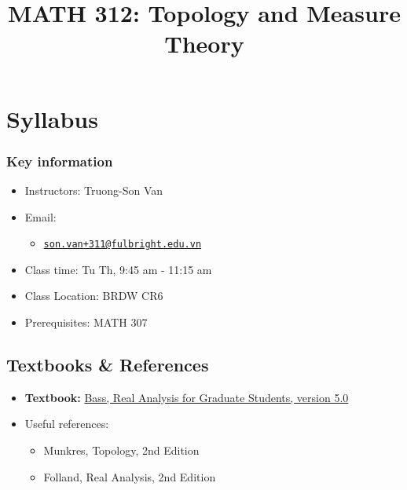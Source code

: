 \documentclass[
  openany]{book}
\title{MATH 312: Topology and Measure Theory}
\author{}
\date{\vspace{-2.5em}}
\providecommand{\tightlist}{%
  \setlength{\itemsep}{0pt}\setlength{\parskip}{0pt}}
\begin{document}
\maketitle

\chapter*{Syllabus}\label{syllabus}

\subsection*{Key information}\label{key-information}

\begin{itemize}
\tightlist
\item
  Instructors: Truong-Son Van
\item
  Email:

  \begin{itemize}
  \tightlist
  \item
    \href{mailto:son.van+311@fulbright.edu.vn}{\nolinkurl{son.van+311@fulbright.edu.vn}}
  \end{itemize}
\item
  Class time: Tu Th, 9:45 am - 11:15 am
\item
  Class Location: BRDW CR6
\item
  Prerequisites: MATH 307
\end{itemize}

\section*{Textbooks \& References}\label{textbooks-references}

\begin{itemize}
\item
  \textbf{Textbook:} \href{https://draft-r-bass-scholar.media.uconn.edu/wp-content/uploads/sites/3926/2024/12/real-analysis-for-graduate-students_version-50_accessible.pdf}{Bass, Real Analysis for Graduate Students, version 5.0}
\item
  Useful references:

  \begin{itemize}
  \item
    Munkres, Topology, 2nd Edition
  \item
    Folland, Real Analysis, 2nd Edition
  \end{itemize}
\end{itemize}
\end{document}
